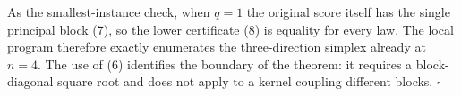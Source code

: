 As the smallest-instance check, when \(q=1\) the original score itself has the single principal block (7), so the lower certificate (8) is equality for every law.  The local program therefore exactly enumerates the three-direction simplex already at \(n=4\).  The use of (6) identifies the boundary of the theorem: it requires a block-diagonal square root and does not apply to a kernel coupling different blocks. \(\square\)